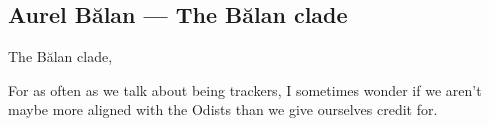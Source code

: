 \hypertarget{aurel-bux103lan-the-bux103lan-clade}{%
\subsection{Aurel Bălan — The Bălan clade}\label{aurel-bux103lan-the-bux103lan-clade}}

The Bălan clade,

For as often as we talk about being trackers, I sometimes wonder if we aren't maybe more aligned with the Odists than we give ourselves credit for.
